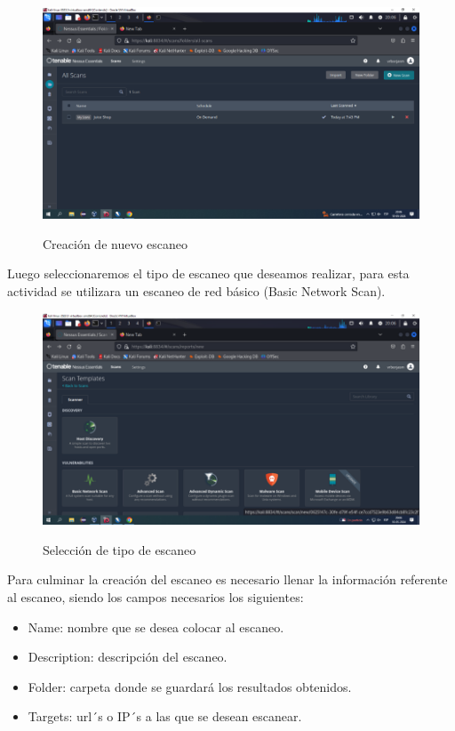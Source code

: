\documentclass[stu, 11pt, letterpaper, donotrepeattitle, floatsintext, natbib]{apa7}
\begin{document}
\begin{figure}[H]
    \centering
    \caption{Creación de nuevo escaneo}
    \includegraphics[width=0.75\linewidth]{Imagen4.png} %
    \label{fig:OverallEffect}
\end{figure}

Luego seleccionaremos el tipo de escaneo que deseamos realizar, para esta actividad se utilizara un escaneo de red básico (Basic Network Scan).

\begin{figure}[H]
    \centering
    \caption{Selección de tipo de escaneo}
    \includegraphics[width=0.75\linewidth]{Imagen5.png} %
    \label{fig:OverallEffect}
\end{figure}

Para culminar la creación del escaneo es necesario llenar la información referente al escaneo, siendo los campos necesarios los siguientes:

\begin{itemize}
\item  Name: nombre que se desea colocar al escaneo.
\item Description: descripción del escaneo.  																 
\item Folder: carpeta donde se guardará los resultados obtenidos.
\item Targets: url´s o IP´s a las que se desean escanear.
\end{itemize}
\end{document}
